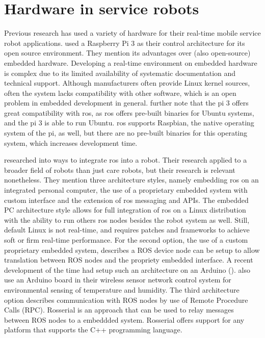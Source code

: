 \documentclass[12pt]{scrreprt}
\begin{document}
\section{Hardware in service robots}
\label{tHardware}
Previous research has used a variety of hardware for their real-time mobile service robot applications. \citeauthor{delgado} used a Raspberry Pi 3 as their control architecture for its open source environment. They mention its advantages over (also open-source) embedded hardware. Developing a real-time environment on embedded hardware is complex due to its limited availability of systematic documentation and technical support. Although manufacturers often provide Linux kernel sources, often the system lacks compatibility with other software, which is an open problem in embedded development in general. \citeauthor{delgado} further note that the \gls{pi} 3 offers great compatibility with \acrfull{ros}, as \acrshort{ros} offers pre-built binaries for Ubuntu systems, and the \gls{pi} 3 is able to run Ubuntu. \acrshort{ros} supports Raspbian, the native operating system of the \gls{pi}, as well, but there are no pre-built  binaries for this operating system, which increases development time.
\par
\cite{bouchier} researched into ways to integrate \acrshort{ros} into a robot. Their research applied to a broader field of robots than just care robots, but their research is relevant nonetheless. They mention three architecture styles, namely embedding \acrshort{ros} on an integrated personal computer, the use of a proprietary embedded system with custom interface and the extension of \acrshort{ros} messaging and APIs. The embedded PC architecture style allows for full integration of \acrshort{ros} on a Linux distribution with the ability to run others \acrshort{ros} nodes besides the robot system as well. Still, default Linux is not real-time, and requires patches and frameworks to achieve soft or firm real-time performance. For the second option, the use of a custom proprietary embedded system, \cite{bouchier} describes a ROS device node can be setup to allow translation between ROS nodes and the propriety embedded interface. A recent development of the time had setup such an architecture on an Arduino (\cite{bouchier}). \cite{arduino} also use an Arduino board in their wireless sensor network control system for environmental sensing of temperature and humidity. The third architecture  option describes communication with ROS nodes by use of Remote Procedure Calls (RPC). Rosserial is an approach that can be used to relay messages between ROS nodes to a embeddded system. Rosserial offers support for any platform that supports the C++ programming language.
\end{document}
